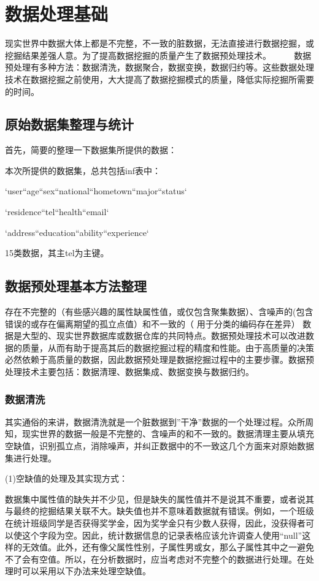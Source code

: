 \section{数据处理基础}

现实世界中数据大体上都是不完整，不一致的脏数据，无法直接进行数据挖掘，或挖掘结果差强人意。为了提高数据挖掘的质量产生了数据预处理技术。 　　
数据预处理有多种方法：数据清洗，数据聚合，数据变换，数据归约等。这些数据处理技术在数据挖掘之前使用，大大提高了数据挖掘模式的质量，降低实际挖掘所需要的时间。

\subsection{原始数据集整理与统计}
首先，简要的整理一下数据集所提供的数据：

本次所提供的数据集，总共包括inf表中：

`user``age``sex``national``hometown``major``status`  

`residence``tel``health``email` 

`address``education``ability``experience`

15类数据，其主tel为主键。
\subsection{数据预处理基本方法整理}
存在不完整的（有些感兴趣的属性缺属性值，或仅包含聚集数据）、含噪声的(包含错误的或存在偏离期望的孤立点值）和不一致的（ 用于分类的编码存在差异） 数据是大型的、现实世界数据库或数据仓库的共同特点。数据预处理技术可以改进数据的质量，从而有助于提高其后的数据挖掘过程的精度和性能。由于高质量的决策必然依赖于高质量的数据，因此数据预处理是数据挖掘过程中的主要步骤。数据预处理技术主要包括：数据清理、数据集成、数据变换与数据归约。
\subsubsection{数据清洗}
其实通俗的来讲，数据清洗就是一个脏数据到”干净”数据的一个处理过程。众所周知，现实世界的数据一般是不完整的、含噪声的和不一致的。数据清理主要从填充空缺值，识别孤立点，消除噪声，并纠正数据中的不一致这几个方面来对原始数据集进行处理。

(1)空缺值的处理及其实现方式：

数据集中属性值的缺失并不少见，但是缺失的属性值并不是说其不重要，或者说其与最终的挖掘结果关联不大。缺失值也并不意味着数据就有错误。例如，一个班级在统计班级同学是否获得奖学金，因为奖学金只有少数人获得，因此，没获得者可以使这个字段为空。因此，统计数据信息的记录表格应该允许调查人使用“null”这样的无效值。此外，还有像父属性性别，子属性男或女，那么子属性其中之一避免不了会有空值。所以，在分析数据时，应当考虑对不完整个的数据进行处理。在处理时可以采用以下办法来处理空缺值。

